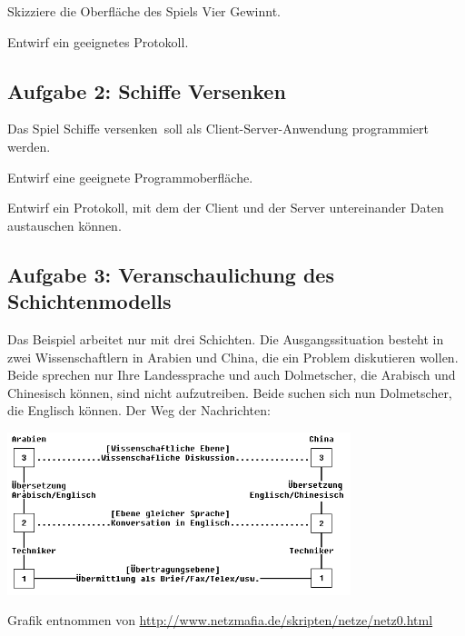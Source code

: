 \begin{compactenum}[a)]
\item Skizziere die Oberfläche des Spiels \glqq Vier Gewinnt\grqq .
\item Entwirf ein geeignetes Protokoll.
\end{compactenum}


\subsection{Aufgabe 2: Schiffe Versenken}

Das Spiel \glqq Schiffe versenken\grqq\ soll als Client-Server-Anwendung
programmiert werden.

\begin{compactenum}[a)]
\item Entwirf eine geeignete Programmoberfläche.
\item Entwirf ein Protokoll, mit dem der Client und der Server untereinander
Daten austauschen können.
\end{compactenum}


\subsection{Aufgabe 3: Veranschaulichung des Schichtenmodells}

Das Beispiel arbeitet nur mit drei Schichten. Die Ausgangssituation besteht in
zwei Wissenschaftlern in Arabien und China, die ein Problem diskutieren wollen.
Beide sprechen nur Ihre Landessprache und auch Dolmetscher, die Arabisch und
Chinesisch können, sind nicht aufzutreiben. Beide suchen sich nun Dolmetscher,
die Englisch können. Der Weg der Nachrichten:

\begin{center}
\includegraphics[width=0.75\textwidth]{./inf/SEKII/42_Netzwerke/schichtenmodell_beispiel.png}

Grafik entnommen von \url{http://www.netzmafia.de/skripten/netze/netz0.html}
\end{center}

